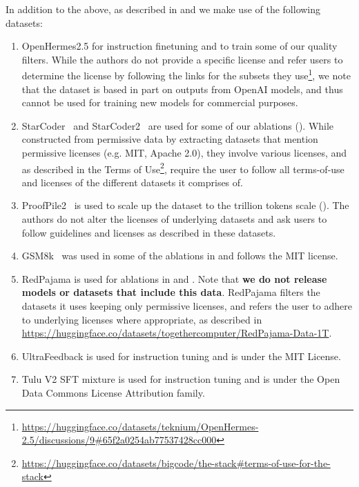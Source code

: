 \documentclass{article}
\begin{document}
In addition to the above, as described in  and  we make use of the following datasets:
\begin{enumerate}
    \item OpenHermes2.5 \citep{openhermes} for instruction finetuning and to train some of our quality filters. While the authors do not provide a specific license and refer users to determine the license by following the links for the subsets they use\footnote{\url{https://huggingface.co/datasets/teknium/OpenHermes-2.5/discussions/9\#65f2a0254ab77537428cc000}}, we note that the dataset is based in part on outputs from OpenAI models, and thus cannot be used for training new models for commercial purposes.
    \item StarCoder~\citep{li2023starcoder} and StarCoder2~\citep{lozhkov2024starcoder} are used for some of our ablations (). While constructed from permissive data by extracting datasets that mention permissive licenses (e.g. MIT, Apache 2.0), they involve various licenses, and as described in the Terms of Use\footnote{\url{https://huggingface.co/datasets/bigcode/the-stack\#terms-of-use-for-the-stack}}, require the user to follow all terms-of-use and licenses of the different datasets it comprises of.
    \item ProofPile2~\citep{azerbayev2023llemma} is used to scale up the dataset to the trillion tokens scale (). The authors do not alter the licenses of underlying datasets and ask users to follow guidelines and licenses as described in these datasets.
    \item GSM8k~\citep{gsm8k} was used in some of the ablations in  and follows the MIT license.
    \item RedPajama \citep{rpj} is used for ablations in  and . Note that \textbf{we do not release models or datasets that include this data}. RedPajama filters the datasets it uses keeping only permissive licenses, and refers the user to adhere to underlying licenses where appropriate, as described in \url{https://huggingface.co/datasets/togethercomputer/RedPajama-Data-1T}.
    \item UltraFeedback \citep{cui2023ultrafeedback} is used for instruction tuning and is under the MIT License.
    \item Tulu V2 SFT mixture \citep{ivison2023camels} is used for instruction tuning and is under the Open Data Commons License Attribution family.

\end{enumerate}
\end{document}
